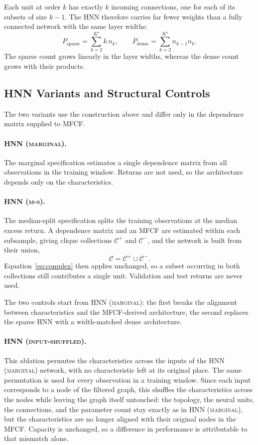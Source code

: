 \documentclass[sigconf,nonacm]{acmart}
\newcommand{\HNNMarg}{\textsc{HNN (marginal)}}
\newcommand{\HNNMS}{\textsc{HNN (m-s)}}
\newcommand{\HNNShuffle}{\textsc{HNN (input-shuffled)}}
\begin{document}
Each unit at order \(k\) has exactly \(k\) incoming connections, one for each of
its subsets of size \(k-1\). The HNN therefore carries far fewer weights than a
fully connected network with the same layer widths:
\begin{equation}
 P_{\mathrm{sparse}}
 =
 \sum_{k=2}^{K^{\star}}k\,n_k,
 \qquad
 P_{\mathrm{dense}}
 =
 \sum_{k=2}^{K^{\star}}n_{k-1}n_k .
 \label{eq:parameter-growth}
\end{equation}
The sparse count grows linearly in the layer widths, whereas the dense count
grows with their products. 


\subsection{HNN Variants and Structural Controls}
The two variants use the construction above and differ only in the dependence
matrix supplied to MFCF.
\paragraph{\HNNMarg.}
The marginal specification estimates a single dependence matrix from all
observations in the training window. Returns are not used, so the architecture
depends only on the characteristics.

\paragraph{\HNNMS.}
The median-split specification splits the training observations at the median excess return. A dependence matrix and an MFCF are estimated within each subsample,
giving clique collections \(\mathcal C^{+}\) and \(\mathcal C^{-}\), and the
network is built from their union,
\begin{equation}
 \mathcal C
 =
 \mathcal C^{+}\cup\mathcal C^{-}.
 \label{eq:ms-union}
\end{equation}
Equation~\eqref{eq:complex} then applies unchanged, so a subset occurring in
both collections still contributes a single unit. Validation and
test returns are never used.

The two controls start from \HNNMarg{}: the first breaks the alignment
between characteristics and the MFCF-derived architecture, the second replaces the sparse HNN with a width-matched dense architecture.

\paragraph{\HNNShuffle.}
This ablation permutes the characteristics across the inputs of the \HNNMarg{} network, with no characteristic left at its original place. The same
permutation is used for every observation in a training window. Since each
input corresponds to a node of the filtered graph, this shuffles the
characteristics across the nodes while leaving the graph itself untouched: the
topology, the neural units, the connections, and the parameter count stay exactly as in
\HNNMarg{}, but the characteristics are no longer aligned with their original nodes in the MFCF. Capacity is unchanged, so a difference in performance is attributable to
that mismatch alone.
\end{document}
